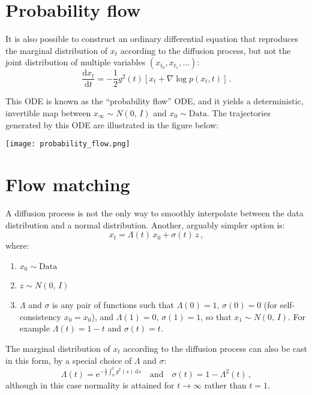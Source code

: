 \documentclass[10pt,letterpaper]{article}
\newcommand{\dd}{\mathrm{d}}
\newcommand{\ee}{\mathrm{e}}
\newcommand{\normal}[2]{N\!\left(#1,\,#2\right)}
\begin{document}
\section{Probability flow}

It is also possible to construct an ordinary differential equation that
reproduces the marginal distribution of $x_t$ according to the diffusion
process, but not the joint distribution of multiple variables $(x_{t_0},
x_{t_1}, ...)$:
\begin{equation}
    \frac{\dd x_t}{\dd t} = - \frac{1}{2} g^2(t) \left[x_t + \nabla \log p(x_t, t) \right]\,.
\end{equation}

This ODE is known as the ``probability flow'' ODE, and it yields a
deterministic, invertible map between $x_\infty \sim \normal{0}{I}$ and $x_0
\sim \mathrm{Data}$.  The trajectories generated by this ODE are illustrated in
the figure below:
\begin{center}
    \texttt{[image: probability\_flow.png]}
\end{center}

\section{Flow matching}

A diffusion process is not the only way to smoothly interpolate between the
data distribution and a normal distribution. Another, arguably simpler option
is:
\begin{equation}
    x_t = \Lambda(t)\, x_0 + \sigma(t)\, z\,,
\end{equation}
where:
\begin{enumerate}
    \item $x_0 \sim \mathrm{Data}$
    \item $z \sim \normal{0}{I}$
    \item $\Lambda$ and $\sigma$ is any pair of functions such that $\Lambda(0)
        = 1$, $\sigma(0) = 0$ (for self-consistency $x_0 = x_0$), and
        $\Lambda(1) = 0$, $\sigma(1) = 1$, so that $x_1 \sim \normal{0}{I}$.
        For example $\Lambda(t) = 1 - t$ and $\sigma(t) = t$.
\end{enumerate}

The marginal distribution of $x_t$ according to  the diffusion process can also
be cast in this form, by a special choice of $\Lambda$ and $\sigma$:
\begin{equation}
    \Lambda(t) = \ee^{-\frac{1}{2} \int_0^{t} g^2(s)\, \dd s}\quad \mathrm{and}\quad \sigma(t) = 1 - \Lambda^2(t)\,,
\end{equation}
although in this case normality is attained for $t \to \infty$ rather than $t = 1$.
\end{document}
